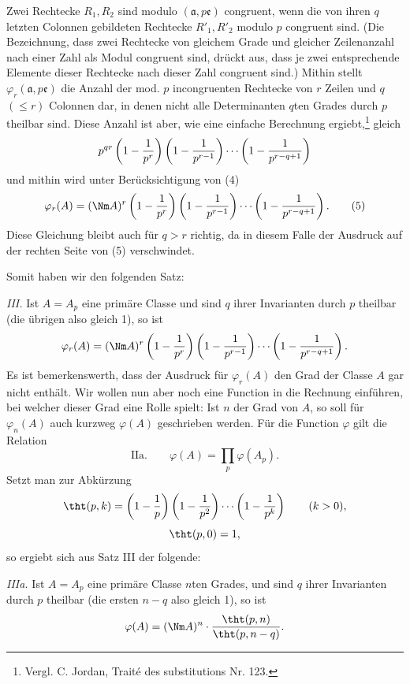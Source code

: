 Zwei Rechtecke $R_1,R_2$ sind modulo $(\mathfrak a,p\mathfrak e)$ congruent, wenn die von ihren $q$ letzten Colonnen gebildeten Rechtecke $R'_1,R'_2$ modulo $p$ congruent sind. (Die Bezeichnung, dass zwei Rechtecke von gleichem Grade und gleicher Zeilenanzahl nach einer Zahl als Modul congruent sind, drückt aus, dass je zwei entsprechende Elemente dieser Rechtecke nach dieser Zahl congruent sind.) Mithin stellt $\varphi_r(\mathfrak a,p\mathfrak e)$ die Anzahl der mod. $p$ incongruenten Rechtecke von $r$ Zeilen und $q$ $(\le r)$ Colonnen dar, in denen nicht alle Determinanten $q$ten Grades durch $p$ theilbar sind. Diese Anzahl ist aber, wie eine einfache Berechnung ergiebt,\footnote{Vergl. C. Jordan, Traité des substitutions Nr. 123.} gleich
\[
 p^{qr}\left(1-{1\over p^r}\right)
 \left(1-{1\over p^{r-1}}\right)
 \cdots
 \left(1-{1\over p^{r-q+1}}\right)
\]
und mithin wird unter Berücksichtigung von (4)
\begin{equation}
 \varphi_r(A)=(\Nm A)^r
 \left(1-{1\over p^r}\right)
 \left(1-{1\over p^{r-1}}\right)
 \cdots
 \left(1-{1\over p^{r-q+1}}\right).
\tag{5}
\end{equation}
Diese Gleichung bleibt auch für $q>r$ richtig, da in diesem Falle der Ausdruck auf der rechten Seite von (5) verschwindet.

Somit haben wir den folgenden Satz:

\emph{III.} Ist $A=A_p$ eine primäre Classe und sind $q$ ihrer Invarianten durch $p$ theilbar (die übrigen also gleich 1), so ist
\[
 \varphi_r(A)=(\Nm A)^r
 \left(1-{1\over p^r}\right)
 \left(1-{1\over p^{r-1}}\right)
 \cdots
 \left(1-{1\over p^{r-q+1}}\right).
\]
Es ist bemerkenswerth, dass der Ausdruck für $\varphi_r(A)$ den Grad der Classe $A$ gar nicht enthält. Wir wollen nun aber noch eine Function in die Rechnung einführen, bei welcher dieser Grad eine Rolle spielt: Ist $n$ der Grad von $A$, so soll für $\varphi_n(A)$ auch kurzweg $\varphi(A)$ geschrieben werden. Für die Function $\varphi$ gilt die Relation
\[
\text{IIa.}\qquad
 \varphi(A)=\prod_p \varphi(A_p).
\]
Setzt man zur Abkürzung
\[
 \tht(p,k)=\left(1-{1\over p}\right)
 \left(1-{1\over p^2}\right)\cdots
 \left(1-{1\over p^k}\right)\qquad (k>0),
\]
\[
 \tht(p,0)=1,
\]
so ergiebt sich aus Satz III der folgende:

\emph{IIIa.} Ist $A=A_p$ eine primäre Classe $n$ten Grades, und sind $q$ ihrer Invarianten durch $p$ theilbar (die ersten $n-q$ also gleich 1), so ist
\[
 \varphi(A)=(\Nm A)^n\cdot {\tht(p,n)\over \tht(p,n-q)}.
\]
